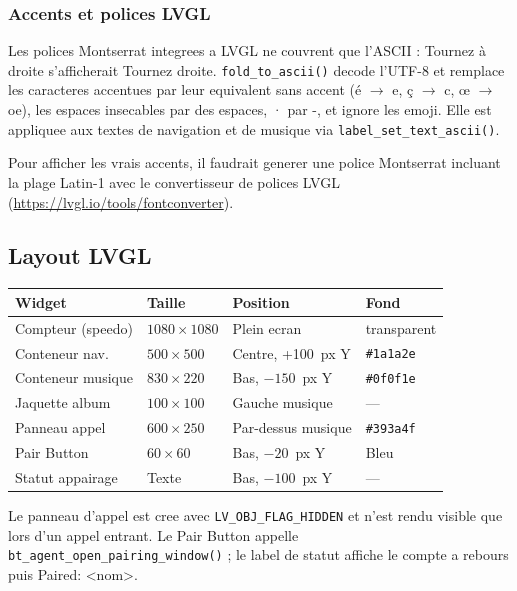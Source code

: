 \documentclass[a4paper,11pt]{article}
\begin{document}
\subsubsection{Accents et polices LVGL}

Les polices Montserrat integrees a LVGL ne couvrent que l'ASCII : \og Tournez à droite\fg{}
s'afficherait \og Tournez  droite\fg{}. \texttt{fold\_to\_ascii()} decode l'UTF-8 et remplace
les caracteres accentues par leur equivalent sans accent (\og é\fg{} $\to$ \og e\fg{},
\og ç\fg{} $\to$ \og c\fg{}, \og œ\fg{} $\to$ \og oe\fg{}), les espaces insecables par des
espaces, \og ·\fg{} par \og -\fg{}, et ignore les emoji. Elle est appliquee aux textes de
navigation et de musique via \texttt{label\_set\_text\_ascii()}.

Pour afficher les vrais accents, il faudrait generer une police Montserrat incluant la
plage Latin-1 avec le convertisseur de polices LVGL (\url{https://lvgl.io/tools/fontconverter}).

\subsection{Layout LVGL}

\begin{center}
\begin{tabular}{llll}
\toprule
\textbf{Widget} & \textbf{Taille} & \textbf{Position} & \textbf{Fond} \\
\midrule
Compteur (speedo) & $1080\times1080$ & Plein ecran & transparent \\
Conteneur nav. & $500\times500$ & Centre, +100~px Y & \texttt{\#1a1a2e} \\
Conteneur musique & $830\times220$ & Bas, $-150$~px Y & \texttt{\#0f0f1e} \\
Jaquette album & $100\times100$ & Gauche musique & --- \\
Panneau appel & $600\times250$ & Par-dessus musique & \texttt{\#393a4f} \\
Pair Button & $60\times60$ & Bas, $-20$~px Y & Bleu \\
Statut appairage & Texte & Bas, $-100$~px Y & --- \\
\bottomrule
\end{tabular}
\end{center}

Le panneau d'appel est cree avec \texttt{LV\_OBJ\_FLAG\_HIDDEN} et n'est rendu
visible que lors d'un appel entrant. Le Pair Button appelle
\texttt{bt\_agent\_open\_pairing\_window()} ; le label de statut affiche le compte a
rebours puis \og Paired: <nom>\fg{}.
\end{document}
